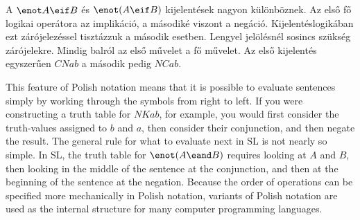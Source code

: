 A $\enot A\eif B$ és $\enot (A\eif B)$ kijelentések nagyon különböznek. Az első fő logikai operátora az implikáció, a másodiké viszont a negáció. Kijelentéslogikában ezt zárójelezéssel tisztázzuk a második esetben. Lengyel jelölésnél sosincs szükség zárójelekre. Mindig balról az első művelet a fő művelet. Az első kijelentés egyszerűen $CNab$ a második pedig $NCab$.




This feature of Polish notation means that it is possible to evaluate sentences simply by working through the symbols from right to left. If you were constructing a truth table for $NKab$, for example, you would first consider the truth-values assigned to $b$ and $a$, then consider their conjunction, and then negate the result. The general rule for what to evaluate next in SL is not nearly so simple. In SL, the truth table for $\enot(A\eand B)$ requires looking at $A$ and $B$, then looking in the middle of the sentence at the conjunction, and then at the beginning of the sentence at the negation. Because the order of operations can be specified more mechanically in Polish notation, variants of Polish notation are used as the internal structure for many computer programming languages.

